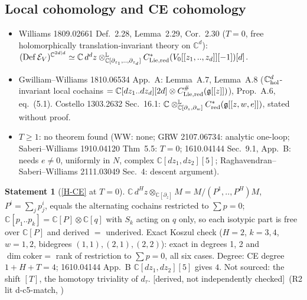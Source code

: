 \documentclass[10pt,a4paper]{article}
\numberwithin{equation}{section}
\theoremstyle{definition}
\newtheorem{dstatement}[theorem]{Statement}
\theoremstyle{remark}
\newcommand{\g}{\mathfrak g}
\newcommand{\der}{\textup{[derived, not independently checked]}}
\begin{document}
\subsection{Local cohomology and CE cohomology}\label{sec-lit-coh}
\begin{itemize}\itemsep1pt
\item Williams 1809.02661 Def.~2.28, Lemma~2.29, Cor.~2.30 ($T=0$, free holomorphically translation-invariant theory on $\mathbb C^d$): $(\mathrm{Def}\,\mathcal E_V)^{\mathbb C^{2d|d}}\simeq\mathbb C\,d^dz\otimes^{\mathbb L}_{\mathbb C[\partial_{z_1},..,\partial_{z_d}]}C^*_{\rm Lie,red}(V_0[[z_1,..,z_d]][-1])[d]$.
\item Gwilliam--Williams 1810.06534 App.~A: Lemma~A.7, Lemma~A.8 ($\mathbb C^d_{\rm hol}$-invariant local cochains $=\mathbb C[dz_1..dz_d][2d]\otimes C^\#_{\rm Lie,red}(\g[[z]])$), Prop.~A.6, eq.~(5.1). Costello 1303.2632 Sec.~16.1: $\mathbb C\otimes^{\mathbb L}_{\mathbb C[\partial_z,\partial_w]}C^*_{\rm red}(\g[[z,w,e]])$, stated without proof.
\item $T\ge1$: no theorem found (WW: none; GRW 2107.06734: analytic one-loop; Saberi--Williams 1910.04120 Thm~5.5: $T=0$; 1610.04144 Sec.~9.1, App.~B: needs $e\ne0$, uniformly in $N$, complex $\mathbb C[dz_1,dz_2][5]$; Raghavendran--Saberi--Williams 2111.03049 Sec.~4: descent argument).
\end{itemize}
\begin{dstatement}[\ref{H-CE} at $T=0$]
$\mathbb C\,d^Hz\otimes_{\mathbb C[\partial_z]}M=M/(P^1,..,P^H)M$, $P^i=\sum_jp^i_j$, equals the alternating cochains restricted to $\sum p=0$; $\mathbb C[p_1..p_k]=\mathbb C[P]\otimes\mathbb C[q]$ with $S_k$ acting on $q$ only, so each isotypic part is free over $\mathbb C[P]$ and derived $=$ underived. Exact Koszul check ($H=2$, $k=3,4$, $w=1,2$, bidegrees $(1,1),(2,1),(2,2)$): exact in degrees 1, 2 and $\dim\mathrm{coker}=$ rank of restriction to $\sum p=0$, all six cases. Degree: CE degree $1+H+T=4$; 1610.04144 App.~B $\mathbb C[dz_1,dz_2][5]$ gives $4$. Not sourced: the shift $[T]$, the homotopy triviality of $d_\tau$. \der\ (R2 lit d-c5-match, )
\end{dstatement}
\end{document}
